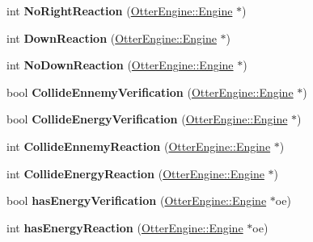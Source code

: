 \begin{DoxyCompactItemize}
\item 
int {\bfseries No\+Right\+Reaction} (\hyperlink{class_otter_engine_1_1_engine}{Otter\+Engine\+::\+Engine} $\ast$)\hypertarget{class_player_a1e96bc15a24315b253dd5e7d9427290c}{}\label{class_player_a1e96bc15a24315b253dd5e7d9427290c}

\item 
int {\bfseries Down\+Reaction} (\hyperlink{class_otter_engine_1_1_engine}{Otter\+Engine\+::\+Engine} $\ast$)\hypertarget{class_player_a1dce3538c9266f8f66aff44448ac8ca8}{}\label{class_player_a1dce3538c9266f8f66aff44448ac8ca8}

\item 
int {\bfseries No\+Down\+Reaction} (\hyperlink{class_otter_engine_1_1_engine}{Otter\+Engine\+::\+Engine} $\ast$)\hypertarget{class_player_a8172df9c77943a0ef323820b221b4bc2}{}\label{class_player_a8172df9c77943a0ef323820b221b4bc2}

\item 
bool {\bfseries Collide\+Ennemy\+Verification} (\hyperlink{class_otter_engine_1_1_engine}{Otter\+Engine\+::\+Engine} $\ast$)\hypertarget{class_player_a264ae02923bc2d4cfc854afdfd2a6576}{}\label{class_player_a264ae02923bc2d4cfc854afdfd2a6576}

\item 
bool {\bfseries Collide\+Energy\+Verification} (\hyperlink{class_otter_engine_1_1_engine}{Otter\+Engine\+::\+Engine} $\ast$)\hypertarget{class_player_a73f14e4e0d98d74624bf9216afcfdf15}{}\label{class_player_a73f14e4e0d98d74624bf9216afcfdf15}

\item 
int {\bfseries Collide\+Ennemy\+Reaction} (\hyperlink{class_otter_engine_1_1_engine}{Otter\+Engine\+::\+Engine} $\ast$)\hypertarget{class_player_a3780fb6e608091e82f0fa862e9970f89}{}\label{class_player_a3780fb6e608091e82f0fa862e9970f89}

\item 
int {\bfseries Collide\+Energy\+Reaction} (\hyperlink{class_otter_engine_1_1_engine}{Otter\+Engine\+::\+Engine} $\ast$)\hypertarget{class_player_a78aaafb4e89498610a408f5482c9ba00}{}\label{class_player_a78aaafb4e89498610a408f5482c9ba00}

\item 
bool {\bfseries has\+Energy\+Verification} (\hyperlink{class_otter_engine_1_1_engine}{Otter\+Engine\+::\+Engine} $\ast$oe)\hypertarget{class_player_a19a155b2728c35923c95856176927d3d}{}\label{class_player_a19a155b2728c35923c95856176927d3d}

\item 
int {\bfseries has\+Energy\+Reaction} (\hyperlink{class_otter_engine_1_1_engine}{Otter\+Engine\+::\+Engine} $\ast$oe)\hypertarget{class_player_a2de9cf4f3e5979fa650a07284fc2cc36}{}\label{class_player_a2de9cf4f3e5979fa650a07284fc2cc36}


\end{DoxyCompactItemize}
